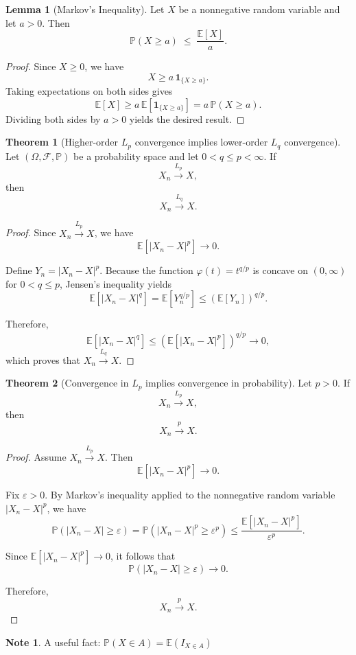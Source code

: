 \documentclass[11pt]{article}
\theoremstyle{definition}
\newtheorem{note}{Note}[section]
\newtheorem{lemma}{Lemma}[section]
\newtheorem{theo}{Theorem}[section]
\begin{document}
\begin{lemma}[Markov's Inequality]
Let $X$ be a nonnegative random variable and let $a>0$.
Then
\[
\mathbb{P}(X \ge a)
\;\le\;
\frac{\mathbb{E}[X]}{a}.
\]
\end{lemma}

\begin{proof}
Since $X \ge 0$, we have
\[
X \ge a\,\mathbf{1}_{\{X\ge a\}}.
\]
Taking expectations on both sides gives
\[
\mathbb{E}[X]
\ge
a\,\mathbb{E}\!\left[\mathbf{1}_{\{X\ge a\}}\right]
=
a\,\mathbb{P}(X\ge a).
\]
Dividing both sides by $a>0$ yields the desired result.
\end{proof}

\begin{theo}[Higher-order $L_p$ convergence implies lower-order $L_q$ convergence]
Let $(\Omega,\mathcal{F},\mathbb{P})$ be a probability space and let
$0 < q \le p < \infty$.
If
\[
X_n \xrightarrow{L_p} X,
\]
then
\[
X_n \xrightarrow{L_q} X.
\]
\end{theo}
\begin{proof}
Since $X_n \xrightarrow{L_p} X$, we have
\[
\mathbb{E}\!\left[ |X_n - X|^p \right] \longrightarrow 0.
\]

Define $Y_n = |X_n - X|^p$.
Because the function $\varphi(t) = t^{q/p}$ is concave on $(0,\infty)$
for $0 < q \le p$, Jensen's inequality yields
\[
\mathbb{E}\!\left[ |X_n - X|^q \right]
=
\mathbb{E}\!\left[ Y_n^{q/p} \right]
\le
\left( \mathbb{E}[Y_n] \right)^{q/p}.
\]

Therefore,
\[
\mathbb{E}\!\left[ |X_n - X|^q \right]
\le
\left(
\mathbb{E}\!\left[ |X_n - X|^p \right]
\right)^{q/p}
\longrightarrow 0,
\]
which proves that $X_n \xrightarrow{L_q} X$.
\end{proof}

\begin{theo}[Convergence in $L_p$ implies convergence in probability]
Let $p>0$.
If
\[
X_n \xrightarrow{L_p} X,
\]
then
\[
X_n \xrightarrow{p} X.
\]
\end{theo}

\begin{proof}
Assume $X_n \xrightarrow{L_p} X$. Then
\[
\mathbb{E}\!\left[ |X_n - X|^p \right] \longrightarrow 0.
\]

Fix $\varepsilon > 0$. By Markov's inequality applied to the nonnegative
random variable $|X_n - X|^p$, we have
\[
\mathbb{P}(|X_n - X| \ge \varepsilon)
=
\mathbb{P}\!\left(|X_n - X|^p \ge \varepsilon^p\right)
\le
\frac{\mathbb{E}\!\left[ |X_n - X|^p \right]}{\varepsilon^p}.
\]

Since $\mathbb{E}[|X_n - X|^p] \to 0$, it follows that
\[
\mathbb{P}(|X_n - X| \ge \varepsilon) \longrightarrow 0.
\]

Therefore,
\[
X_n \xrightarrow{p} X.
\]
\end{proof}
\begin{note}
    A useful fact: $\mathbb{P}(X\in A) = \mathbb{E}(I_{X\in A})$
\end{note}
\end{document}
